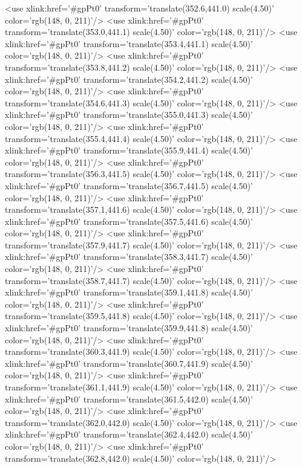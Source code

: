 	<use xlink:href='#gpPt0' transform='translate(352.6,441.0) scale(4.50)' color='rgb(148,   0, 211)'/>
	<use xlink:href='#gpPt0' transform='translate(353.0,441.1) scale(4.50)' color='rgb(148,   0, 211)'/>
	<use xlink:href='#gpPt0' transform='translate(353.4,441.1) scale(4.50)' color='rgb(148,   0, 211)'/>
	<use xlink:href='#gpPt0' transform='translate(353.8,441.2) scale(4.50)' color='rgb(148,   0, 211)'/>
	<use xlink:href='#gpPt0' transform='translate(354.2,441.2) scale(4.50)' color='rgb(148,   0, 211)'/>
	<use xlink:href='#gpPt0' transform='translate(354.6,441.3) scale(4.50)' color='rgb(148,   0, 211)'/>
	<use xlink:href='#gpPt0' transform='translate(355.0,441.3) scale(4.50)' color='rgb(148,   0, 211)'/>
	<use xlink:href='#gpPt0' transform='translate(355.4,441.4) scale(4.50)' color='rgb(148,   0, 211)'/>
	<use xlink:href='#gpPt0' transform='translate(355.9,441.4) scale(4.50)' color='rgb(148,   0, 211)'/>
	<use xlink:href='#gpPt0' transform='translate(356.3,441.5) scale(4.50)' color='rgb(148,   0, 211)'/>
	<use xlink:href='#gpPt0' transform='translate(356.7,441.5) scale(4.50)' color='rgb(148,   0, 211)'/>
	<use xlink:href='#gpPt0' transform='translate(357.1,441.6) scale(4.50)' color='rgb(148,   0, 211)'/>
	<use xlink:href='#gpPt0' transform='translate(357.5,441.6) scale(4.50)' color='rgb(148,   0, 211)'/>
	<use xlink:href='#gpPt0' transform='translate(357.9,441.7) scale(4.50)' color='rgb(148,   0, 211)'/>
	<use xlink:href='#gpPt0' transform='translate(358.3,441.7) scale(4.50)' color='rgb(148,   0, 211)'/>
	<use xlink:href='#gpPt0' transform='translate(358.7,441.7) scale(4.50)' color='rgb(148,   0, 211)'/>
	<use xlink:href='#gpPt0' transform='translate(359.1,441.8) scale(4.50)' color='rgb(148,   0, 211)'/>
	<use xlink:href='#gpPt0' transform='translate(359.5,441.8) scale(4.50)' color='rgb(148,   0, 211)'/>
	<use xlink:href='#gpPt0' transform='translate(359.9,441.8) scale(4.50)' color='rgb(148,   0, 211)'/>
	<use xlink:href='#gpPt0' transform='translate(360.3,441.9) scale(4.50)' color='rgb(148,   0, 211)'/>
	<use xlink:href='#gpPt0' transform='translate(360.7,441.9) scale(4.50)' color='rgb(148,   0, 211)'/>
	<use xlink:href='#gpPt0' transform='translate(361.1,441.9) scale(4.50)' color='rgb(148,   0, 211)'/>
	<use xlink:href='#gpPt0' transform='translate(361.5,442.0) scale(4.50)' color='rgb(148,   0, 211)'/>
	<use xlink:href='#gpPt0' transform='translate(362.0,442.0) scale(4.50)' color='rgb(148,   0, 211)'/>
	<use xlink:href='#gpPt0' transform='translate(362.4,442.0) scale(4.50)' color='rgb(148,   0, 211)'/>
	<use xlink:href='#gpPt0' transform='translate(362.8,442.0) scale(4.50)' color='rgb(148,   0, 211)'/>
